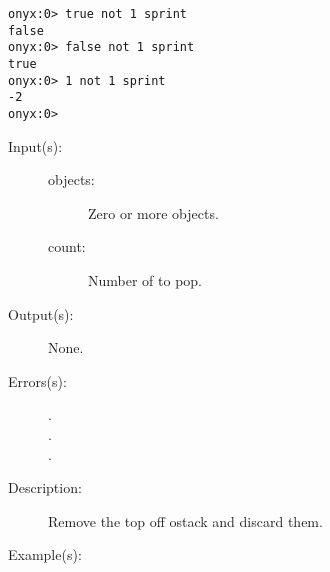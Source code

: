 \begin{description}
\begin{description}
\begin{verbatim}
onyx:0> true not 1 sprint
false
onyx:0> false not 1 sprint
true
onyx:0> 1 not 1 sprint
-2
onyx:0>
		\end{verbatim}
	\end{description}
\label{systemdict:npop}
\item[{\onyxop{objects count}{npop}{--}}: ]
	\begin{description}\item[]
	\item[Input(s): ]
		\begin{description}\item[]
		\item[objects: ]
			Zero or more objects.
		\item[count: ]
			Number of  to pop.
		\end{description}
	\item[Output(s): ] None.
	\item[Errors(s): ]
		\begin{description}\item[]
		\item[.]
		\item[.]
		\item[.]
		\end{description}
	\item[Description: ]
		Remove the top   off ostack and
		discard them.
	\item[Example(s): ]\begin{verbatim}


\end{verbatim}
\end{description}
\end{description}
